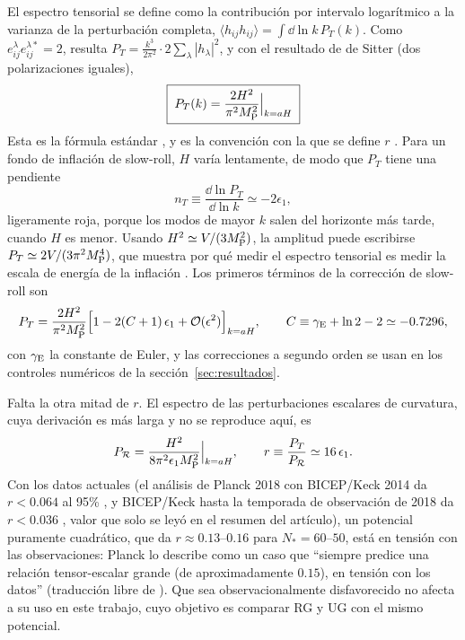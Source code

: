El espectro tensorial se define como la contribución por intervalo logarítmico a la varianza de la perturbación completa, $\langle h_{ij}h_{ij}\rangle=\int\dd\ln k\,P_T(k)$. Como $e^\lambda_{ij}e^{\lambda*}_{ij}=2$, resulta $P_T=\frac{k^3}{2\pi^2}\cdot2\sum_\lambda|h_\lambda|^2$, y con el resultado de de Sitter (dos polarizaciones iguales),
\begin{equation}
\boxed{\;P_T(k)=\frac{2H^2}{\pi^2M_{\rm P}^2}\Big|_{k=aH}\;}
\label{eq:PTRG}
\end{equation}
Esta es la fórmula estándar , y es la convención con la que se define $r$ \cite{baumann22,martin14}. Para un fondo de inflación de slow-roll, $H$ varía lentamente, de modo que $P_T$ tiene una pendiente
\begin{equation}
n_T\equiv\frac{\dd\ln P_T}{\dd\ln k}\simeq-2\epsilon_1,
\label{eq:nT}
\end{equation}
ligeramente roja, porque los modos de mayor $k$ salen del horizonte más tarde, cuando $H$ es menor. Usando $H^2\simeq V/(3M_{\rm P}^2)$, la amplitud puede escribirse $P_T\simeq2V/(3\pi^2M_{\rm P}^4)$, que muestra por qué medir el espectro tensorial es medir la escala de energía de la inflación \cite{baumann22}. Los primeros términos de la corrección de slow-roll son \cite{martin14}
\begin{equation}
P_T=\frac{2H^2}{\pi^2M_{\rm P}^2}\Big[1-2(C+1)\,\epsilon_1+\mathcal O(\epsilon^2)\Big]_{k=aH},\qquad C\equiv\gamma_{\rm E}+\ln2-2\simeq-0.7296,
\label{eq:PTNLO}
\end{equation}
con $\gamma_{\rm E}$ la constante de Euler, y las correcciones a segundo orden se usan en los controles numéricos de la sección~\ref{sec:resultados}.

Falta la otra mitad de $r$. El espectro de las perturbaciones escalares de curvatura, cuya derivación es más larga y no se reproduce aquí, es \cite{martin14}
\begin{equation}
P_\mathcal{R}=\frac{H^2}{8\pi^2\epsilon_1M_{\rm P}^2}\Big|_{k=aH},\qquad r\equiv\frac{P_T}{P_\mathcal{R}}\simeq16\,\epsilon_1.
\label{eq:PRr}
\end{equation}
Con los datos actuales (el análisis de Planck 2018 con BICEP/Keck 2014 da $r<0.064$ al 95\% \cite{planck20}, y BICEP/Keck hasta la temporada de observación de 2018 da $r<0.036$ \cite{bicep21}, valor que solo se leyó en el resumen del artículo), un potencial puramente cuadrático, que da $r\approx0.13$--$0.16$ para $N_*=60$--$50$, está en tensión con las observaciones: Planck lo describe como un caso que ``siempre predice una relación tensor-escalar grande (de aproximadamente $0.15$), en tensión con los datos'' (traducción libre de \cite{planck20}). Que sea observacionalmente disfavorecido no afecta a su uso en este trabajo, cuyo objetivo es comparar RG y UG con el mismo potencial.
